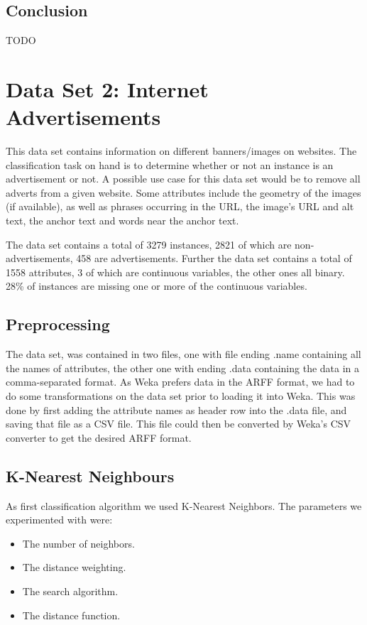 \documentclass{sig-alternate-05-2015}
\begin{document}
\subsection{Conclusion}
TODO\\


\section{Data Set 2: Internet Advertisements}
This data set contains information on different banners/images on websites. The classification task on hand is to determine whether or not an instance is an advertisement or not. A possible use case for this data set would be to remove all adverts from a given website. Some attributes include the geometry of the images (if available), as well as phrases occurring in the URL, the image's URL and alt text, the anchor text and words near the anchor text.

The data set contains a total of 3279 instances, 2821 of which are non-advertisements, 458 are advertisements. Further the data set contains a total of 1558 attributes, 3 of which are continuous variables, the other ones all binary. 28\% of instances are missing one or more of the continuous variables.


\subsection{Preprocessing}
The data set, was contained in two files, one with file ending .name containing all the names of attributes, the other one with ending .data containing the data in a comma-separated format. As Weka prefers data in the ARFF format, we had to do some transformations on the data set prior to loading it into Weka. This was done by first adding the attribute names as header row into the .data file, and saving that file as a CSV file. This file could then be converted by Weka's CSV converter to get the desired ARFF format.

\subsection{K-Nearest Neighbours}
As first classification algorithm we used K-Nearest Neighbors. The parameters we experimented with were:

\begin{itemize}
\item The number of neighbors.
\item The distance weighting.
\item The search algorithm.
\item The distance function.
\end{itemize}
\end{document}
